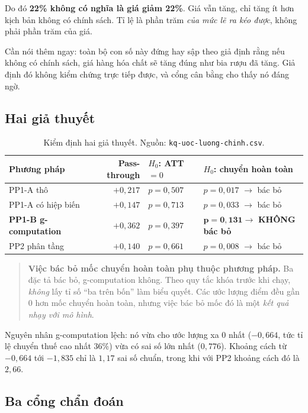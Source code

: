 \documentclass[11pt]{article}
\begin{document}
Do đó \textbf{22\% không có nghĩa là giá giảm 22\%}. Giá vẫn tăng, chỉ tăng ít hơn kịch bản không
có chính sách. Tỉ lệ là phần trăm \emph{của mức lẽ ra kéo được}, không phải phần trăm của giá.

Cần nói thêm ngay: toàn bộ con số này đứng hay sập theo giả định rằng nếu không có chính sách, giá
hàng hóa chất sẽ tăng đúng như bia rượu đã tăng. Giả định đó không kiểm chứng trực tiếp được, và
cổng cân bằng cho thấy nó đáng ngờ.

\subsection{Hai giả thuyết}

\begin{table}[htbp]
  \centering
  \caption{Kiểm định hai giả thuyết. Nguồn: \texttt{kq-uoc-luong-chinh.csv}.}
  \label{tab:hai-gia-thuyet}
  \begin{tabular}{lrll}
    \toprule
    Phương pháp & Pass-through & $H_0$: ATT $=0$ & $H_0$: chuyển hoàn toàn \\
    \midrule
    PP1-A thô           & $+0{,}217$ & $p = 0{,}507$ & $p = 0{,}017$ $\to$ bác bỏ \\
    PP1-A có hiệp biến  & $+0{,}147$ & $p = 0{,}713$ & $p = 0{,}033$ $\to$ bác bỏ \\
    \textbf{PP1-B g-computation} & $+0{,}362$ & $p = 0{,}397$
    & $\mathbf{p = 0{,}131 \to}$ \textbf{KHÔNG bác bỏ} \\
    PP2 phân tầng       & $+0{,}140$ & $p = 0{,}661$ & $p = 0{,}008$ $\to$ bác bỏ \\
    \bottomrule
  \end{tabular}
\end{table}

\begin{quote}
\textbf{Việc bác bỏ mốc chuyển hoàn toàn phụ thuộc phương pháp.} Ba đặc tả bác bỏ, g-computation
không. Theo quy tắc khóa trước khi chạy, \emph{không} lấy tỉ số ``ba trên bốn'' làm biểu quyết. Các
ước lượng điểm đều gần 0 hơn mốc chuyển hoàn toàn, nhưng việc bác bỏ mốc đó là một
\emph{kết quả nhạy với mô hình}.
\end{quote}

Nguyên nhân g-computation lệch: nó vừa cho ước lượng xa 0 nhất ($-0{,}664$, tức tỉ lệ chuyển thuế
cao nhất 36\%) vừa có sai số lớn nhất ($0{,}776$). Khoảng cách từ $-0{,}664$ tới $-1{,}835$ chỉ là
$1{,}17$ sai số chuẩn, trong khi với PP2 khoảng cách đó là $2{,}66$.

\subsection{Ba cổng chẩn đoán}
\label{sec:ba-cong}
\end{document}
